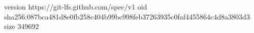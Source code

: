 version https://git-lfs.github.com/spec/v1
oid sha256:087bca481d8e0fb258c404b99bc998feb37263935c0faf4455864c4d8a3803d3
size 349692
